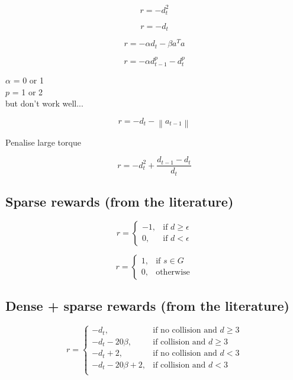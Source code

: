 \documentclass{article}
\newcommand{\norm}[1]{\left\lVert#1\right\rVert}
\begin{document}
\begin{equation}
r = - d_t^2
\end{equation}


\begin{equation}
r = - d_t
\end{equation}


\begin{equation}
r = -\alpha d_t - \beta a^T a
\end{equation}

\begin{equation}
r = -\alpha d_{t-1}^p - d_t^p 
\end{equation}

$\alpha$ = 0 or 1 \\
$p$ = 1 or 2 \\
but don't work well...

\begin{equation}
r = - d_t -  \norm{a_{t-1}}
\end{equation}

Penalise large torque

\begin{equation}
r = - d_t^2+ \frac{d_{t-1} - d_t}{d_t}
\end{equation}

\subsection{Sparse rewards (from the literature)}

\begin{equation}
r = \begin{cases}
    -1, & \text{if $d \geq \epsilon $}\\
    0, & \text{if $d < \epsilon $}
  \end{cases}
\end{equation}

\begin{equation}
r = \begin{cases}
    1, & \text{if $s \in G $}\\
    0, & \text{otherwise}
  \end{cases}
\end{equation}


\subsection{Dense + sparse rewards (from the literature)}

\begin{equation}
r = \begin{cases}
    -d_t, & \text{if no collision and $d \geq 3$}\\
    -d_t - 20\beta , & \text{if collision and $d \geq 3$}\\
    -d_t + 2 , & \text{if no collision and $d < 3$} \\
    -d_t - 20\beta + 2, & \text{if collision and $d < 3$}\\
  \end{cases}
\end{equation}
\end{document}

